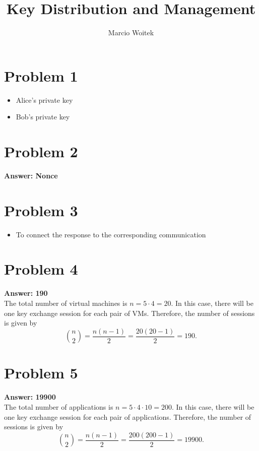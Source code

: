 \documentclass[11pt]{article}
\author{Marcio Woitek}
\date{}
\title{Key Distribution and Management}
\begin{document}
\maketitle
\thispagestyle{empty}
\pagestyle{empty}
\section*{Problem 1}
\label{sec:org977e802}
\begin{itemize}
\item Alice's private key
\item Bob's private key
\end{itemize}
\section*{Problem 2}
\label{sec:orgb434af4}
\textbf{Answer: Nonce}
\section*{Problem 3}
\label{sec:orgd1826d4}
\begin{itemize}
\item To connect the response to the corresponding communication
\end{itemize}
\section*{Problem 4}
\label{sec:org3979162}
\textbf{Answer: 190}\\

The total number of virtual machines is \(n=5\cdot 4=20\). In this case, there
will be one key exchange session for each pair of VMs. Therefore, the number of
sessions is given by
\begin{equation}
\binom{n}{2}=\frac{n(n-1)}{2}=\frac{20(20-1)}{2}=190.
\end{equation}
\section*{Problem 5}
\label{sec:org46bb9ae}
\textbf{Answer: 19900}\\

The total number of applications is \(n=5\cdot 4\cdot 10=200\). In this case,
there will be one key exchange session for each pair of applications. Therefore,
the number of sessions is given by
\begin{equation}
\binom{n}{2}=\frac{n(n-1)}{2}=\frac{200(200-1)}{2}=19900.
\end{equation}
\end{document}
